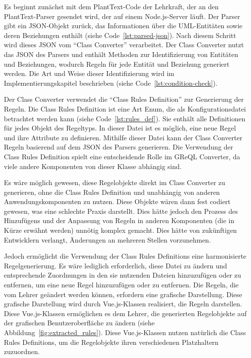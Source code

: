 Es beginnt zunächst mit dem PlantText-Code der Lehrkraft, der an den PlantText-Parser gesendet wird, der auf einem
Node.js-Server läuft. Der Parser gibt ein JSON-Objekt zurück, das Informationen über die UML-Entitäten sowie deren
Beziehungen enthält (siehe Code~\ref{lst:parsed-json}). Nach diesem Schritt wird dieses JSON vom ``Class Converter''
verarbeitet. Der Class Converter nutzt das JSON des Parsers und enthält Methoden zur Identifizierung von Entitäten und
Beziehungen, wodurch Regeln für jede Entität und Beziehung generiert werden. Die Art und Weise dieser
Identifizierung wird im Implementierungskapitel beschrieben (siehe Code~\ref{lst:condition-check}).


Der Class Converter verwendet die ``Class Rules Definition'' zur Generierung der Regeln. Die Class Rules Definition ist
eine Art Enum, die als Konfigurationsdatei betrachtet werden kann (siehe Code~\ref{lst:rules_def}). Sie enthält alle
Definitionen für jedes Objekt des Regeltyps. In dieser Datei ist es möglich, eine neue Regel und ihre Attribute zu
definieren. Mithilfe dieser Datei kann der Class Converter Regeln basierend auf dem JSON des Parsers generieren.
Die Verwendung der Class Rules Definition spielt eine entscheidende Rolle im GReQL Converter, da viele andere
Komponenten von dieser Klasse abhängig sind.


Es wäre möglich gewesen, diese Regelobjekte direkt im Class Converter zu generieren, ohne die Class Rules Definition und
unabhängig von anderen Anwendungskomponenten zu nutzen. Diese Objekte wären dann fest codiert gewesen, was eine
schlechte Praxis darstellt. Dies hätte jedoch den Prozess des Hinzufügens und der Anpassung von Regeln in anderen
Komponenten (die in Kürze erwähnt werden) unnötig komplex gemacht. Dies hätte von zukünftigen Entwicklern verlangt,
Änderungen an mehreren Stellen vorzunehmen.


Jedoch ermöglicht die Verwendung der Class Rules Definitions eine harmonisierte Regelgenerierung. Es wäre lediglich
erforderlich, diese Datei zu ändern und entsprechende Zuordnungen in den sie nutzenden Dateien hinzuzufügen oder zu
entfernen, um eine neue Regel hinzuzufügen oder zu entfernen. Die Regeln, die vom Lehrer geändert werden können,
erfordern eine grafische Darstellung. Diese grafische Darstellung wird durch Vue.js-Klassen realisiert, die Regeln
darstellen. Diese Vue.js-Klassen ermöglichen es dem Lehrer, die generierten Regelobjekte auf der grafischen
Benutzeroberfläche zu ändern (siehe Abbildung~\ref{fig:extracted_rules}). Diese Vue.js-Klassen nutzen natürlich die
Class Rules Definitions, um die Regelobjekte ihren verschiedenen Platzhaltern zuzuordnen.

